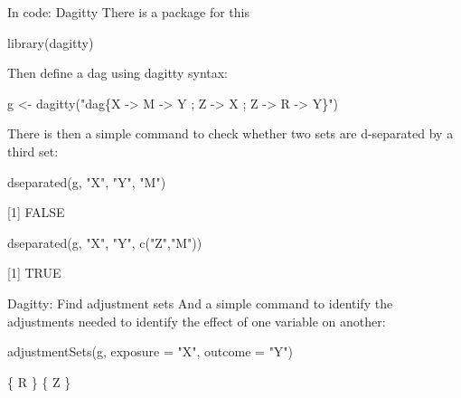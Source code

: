 \documentclass[
  11pt,
  ignorenonframetext,
]{beamer}
\newenvironment{Shaded}{\begin{snugshade}}{\end{snugshade}}
\newcommand{\AttributeTok}[1]{\textcolor[rgb]{0.40,0.45,0.13}{#1}}
\newcommand{\FunctionTok}[1]{\textcolor[rgb]{0.28,0.35,0.67}{#1}}
\newcommand{\NormalTok}[1]{\textcolor[rgb]{0.00,0.23,0.31}{#1}}
\newcommand{\OtherTok}[1]{\textcolor[rgb]{0.00,0.23,0.31}{#1}}
\newcommand{\StringTok}[1]{\textcolor[rgb]{0.13,0.47,0.30}{#1}}
\begin{document}
\begin{frame}[fragile]{In code: Dagitty}
\protect\hypertarget{in-code-dagitty}{}
There is a package for this

\begin{Shaded}
\begin{Highlighting}[]
\FunctionTok{library}\NormalTok{(dagitty)}
\end{Highlighting}
\end{Shaded}

Then define a dag using dagitty syntax:

\begin{Shaded}
\begin{Highlighting}[]
\NormalTok{g }\OtherTok{\textless{}{-}} \FunctionTok{dagitty}\NormalTok{(}\StringTok{"dag\{X {-}\textgreater{} M {-}\textgreater{} Y ; Z {-}\textgreater{} X ; Z {-}\textgreater{} R {-}\textgreater{} Y\}"}\NormalTok{)}
\end{Highlighting}
\end{Shaded}

There is then a simple command to check whether two sets are d-separated
by a third set:

\begin{Shaded}
\begin{Highlighting}[]
\FunctionTok{dseparated}\NormalTok{(g, }\StringTok{"X"}\NormalTok{, }\StringTok{"Y"}\NormalTok{, }\StringTok{"M"}\NormalTok{)}
\end{Highlighting}
\end{Shaded}

{[}1{]} FALSE

\begin{Shaded}
\begin{Highlighting}[]
\FunctionTok{dseparated}\NormalTok{(g, }\StringTok{"X"}\NormalTok{, }\StringTok{"Y"}\NormalTok{, }\FunctionTok{c}\NormalTok{(}\StringTok{"Z"}\NormalTok{,}\StringTok{"M"}\NormalTok{))}
\end{Highlighting}
\end{Shaded}

{[}1{]} TRUE
\end{frame}

\begin{frame}[fragile]{Dagitty: Find adjustment sets}
\protect\hypertarget{dagitty-find-adjustment-sets}{}
And a simple command to identify the adjustments needed to identify the
effect of one variable on another:

\begin{Shaded}
\begin{Highlighting}[]
\FunctionTok{adjustmentSets}\NormalTok{(g, }\AttributeTok{exposure =} \StringTok{"X"}\NormalTok{, }\AttributeTok{outcome =} \StringTok{"Y"}\NormalTok{)}
\end{Highlighting}
\end{Shaded}

\{ R \} \{ Z \}
\end{frame}
\end{document}
